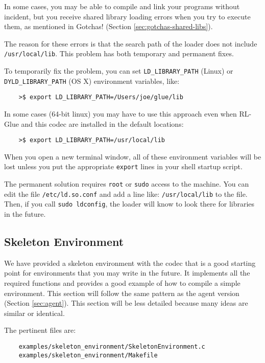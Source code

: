 \documentclass[11pt]{article}
\begin{document}
In some cases, you may be able to compile and link your programs without incident, but you receive shared library loading errors when you try to execute them, as mentioned in Gotchas! (Section \ref{sec:gotchas-shared-libs}).

The reason for these errors is that the search path of the loader does not include \texttt{/usr/local/lib}.  This problem has both temporary and permanent fixes.

To temporarily fix the problem, you can set \texttt{LD\_LIBRARY\_PATH} (Linux) or \texttt{DYLD\_LIBRARY\_PATH} (OS X) environment variables, like:
\begin{verbatim}
	>$ export LD_LIBRARY_PATH=/Users/joe/glue/lib
\end{verbatim}

In some cases (64-bit linux) you may have to use this approach even when RL-Glue and this codec are installed in the default locations:
\begin{verbatim}
	>$ export LD_LIBRARY_PATH=/usr/local/lib
\end{verbatim}

When you open a new terminal window, all of these environment variables will be lost unless you put the appropriate \texttt{export} lines in your shell startup script.

The permanent solution requires \texttt{root} or \texttt{sudo} access to the machine.  You can  edit the file \texttt{/etc/ld.so.conf} and add a line like: \texttt{/usr/local/lib} to the file.  Then, if you call \texttt{sudo ldconfig}, the loader will know to look there for libraries in the future.




\subsection{Skeleton Environment}
\label{sec:env}
We have provided a skeleton environment with the codec that is a good starting point for environments that you may write in the future.
It implements all the required functions and provides a good example of how to compile a simple environment.  This section will follow the same 
pattern as the agent version (Section \ref{sec:agent}).  This section will be less detailed because many ideas are similar or identical.

The pertinent files are:
\begin{verbatim}
	examples/skeleton_environment/SkeletonEnvironment.c
	examples/skeleton_environment/Makefile
\end{verbatim}
\end{document}
